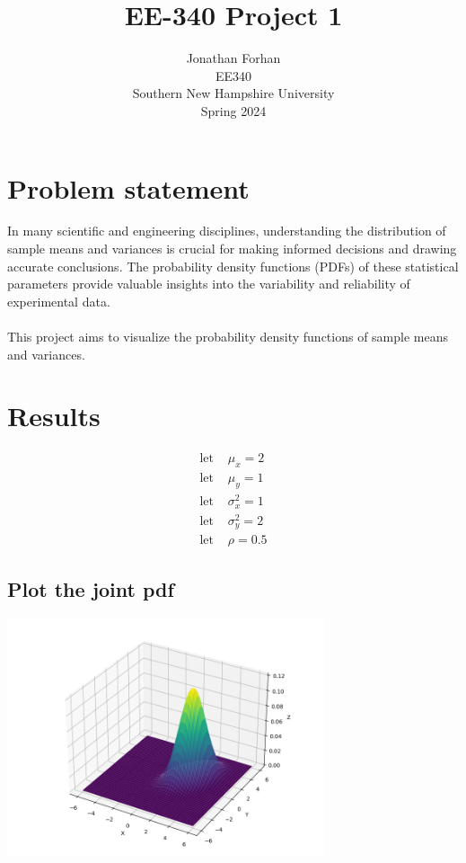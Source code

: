 \documentclass[12pt]{article}
\title{EE-340 Project 1}
\author{Jonathan Forhan\\ EE340\\ Southern New Hampshire University\\ Spring 2024}
\date{ }
\begin{document}
\maketitle
\thispagestyle{empty}
\clearpage

\section{Problem statement}

In many scientific and engineering disciplines, understanding the distribution of
sample means and variances is crucial for making informed decisions and drawing
accurate conclusions. The probability density functions (PDFs) of these statistical
parameters provide valuable insights into the variability and reliability of experimental
data. \\ \\
This project aims to visualize the probability density functions of sample means and variances.

\section{Results}

\[
	\begin{aligned}
		\textrm{let } & \mu_x        =2 \\
		\textrm{let } & \mu_y        =1 \\
		\textrm{let } & \sigma_x^2   =1 \\
		\textrm{let } & \sigma_y^2   =2 \\
		\textrm{let } & \rho  = 0.5
	\end{aligned}
\]

\boldmath
\subsection{Plot the joint pdf}
\unboldmath

\includegraphics[width=0.7\textwidth]{./pdf-1.png}
\end{document}
